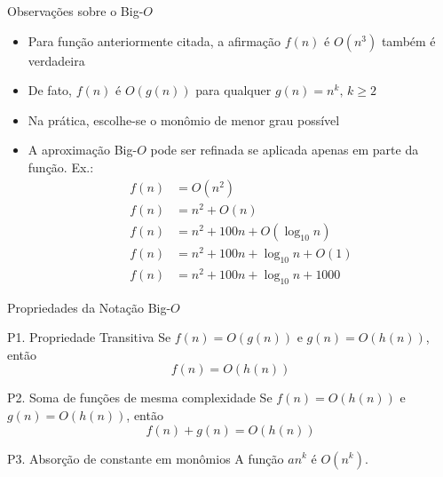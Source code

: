 \begin{frame}[fragile]{Observações sobre o Big-$O$}

	\begin{itemize}
		\item Para função anteriormente citada, a afirmação  $f(n)$ é $O(n^3)$ também é verdadeira

		\item De fato, $f(n)$ é $O(g(n))$ para qualquer $g(n)=n^k,\, k \geq 2$ 

		\item Na prática, escolhe-se o monômio de menor grau possível

		\item A aproximação Big-$O$ pode ser refinada se aplicada apenas em parte da função. Ex.:
        \begin{align*}
            f(n) & = O(n^2) \\
            f(n) & = n^2 + O(n) \\
            f(n) & = n^2 + 100n + O(\log_{10} n) \\
            f(n) & = n^2 + 100n + \log_{10} n + O(1) \\
            f(n) & = n^2 + 100n + \log_{10} n + 1000 
        \end{align*}
	\end{itemize}

\end{frame}

\begin{frame}[fragile]{Propriedades da Notação Big-$O$}

	\begin{block}{P1. Propriedade Transitiva}
        Se $f(n)=O(g(n))$ e $g(n) = O(h(n))$, então 
        \[
            f(n)=O(h(n))
        \]
	\end{block}

    \vspace{0.1in}

	\begin{block}{P2. Soma de funções de mesma complexidade}
        Se $f(n)=O(h(n))$ e $g(n)=O(h(n))$, então 
        \[
            f(n)+g(n)=O(h(n))
        \]
	\end{block}

    \vspace{0.1in}

	\begin{block}{P3. Absorção de constante em monômios}
        A função $an^k$ é $O(n^k)$.
	\end{block}

\end{frame}

